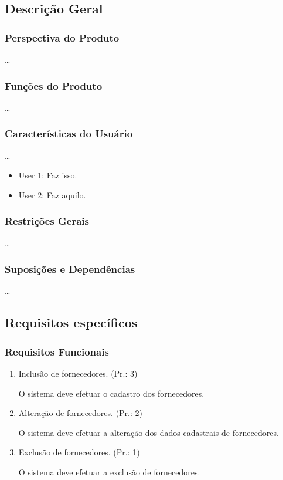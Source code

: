 \subsection{Descrição Geral}

	\subsubsection{Perspectiva do Produto}
	\ldots
	
	\subsubsection{Funções do Produto}
	\ldots
	
	\subsubsection{Características do Usuário}
	\ldots
	\begin{itemize}
	\item[] User 1: Faz isso.
	\item[] User 2: Faz aquilo.
	\end{itemize}

	\subsubsection{Restrições Gerais}
	\ldots
	
	\subsubsection{Suposições e Dependências}
	\ldots
	
	
\subsection{Requisitos específicos}

\subsubsection{Requisitos Funcionais}
\begin{enumerate}[
	label=RF\arabic{*}, 
	ref=(RF\arabic{*}),
	leftmargin=1.5em,
	itemindent=4.5em]
\item Inclusão de fornecedores. (Pr.: 3)\par
O sistema deve efetuar o cadastro dos fornecedores.\par
\item Alteração de fornecedores. (Pr.: 2)\par
O sistema deve efetuar a alteração dos dados cadastrais de fornecedores.\par
\item Exclusão de fornecedores. (Pr.: 1)\par
O sistema deve efetuar a exclusão de fornecedores.\par
\end{enumerate}

